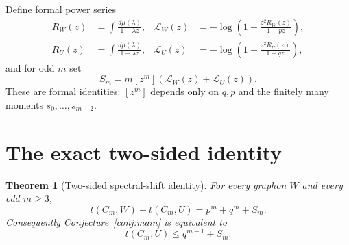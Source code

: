 \documentclass[11pt]{article}
\newtheorem{theorem}{Theorem}[section]
\begin{document}
Define formal power series
\begin{align}
        R_W(z)&=\int \frac{d\mu(\lambda)}{1+\lambda z},
        &
        \mathcal L_W(z)&=-\log\left(1-\frac{z^2R_W(z)}{1-pz}\right),\label{eq:LW}\\
        R_U(z)&=\int \frac{d\mu(\lambda)}{1-\lambda z},
        &
        \mathcal L_U(z)&=-\log\left(1-\frac{z^2R_U(z)}{1-qz}\right),\label{eq:LU}
\end{align}
and for odd $m$ set
\begin{equation}\label{eq:S-def}
        S_m=m[z^m](\mathcal L_W(z)+\mathcal L_U(z)).
\end{equation}
These are formal identities: $[z^m]$ depends only on $q,p$ and the finitely many moments $s_0,\ldots,s_{m-2}$.

\section{The exact two-sided identity}\label{sec:two-sided}

\begin{theorem}[Two-sided spectral-shift identity]\label{thm:two-sided}
For every graphon $W$ and every odd $m\ge3$,
\begin{equation}\label{eq:two-sided}
        t(C_m,W)+t(C_m,U)=p^m+q^m+S_m.
\end{equation}
Consequently Conjecture~\ref{conj:main} is equivalent to
\begin{equation}\label{eq:equiv}
        t(C_m,U)\le q^{m-1}+S_m.
\end{equation}
\end{theorem}
\end{document}
